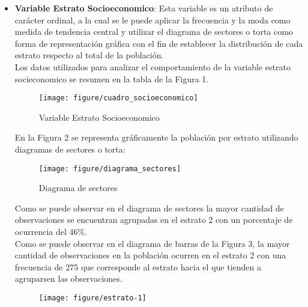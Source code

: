   \begin{itemize}
	\item \textbf {Variable Estrato Socioeconomico}: Esta variable es un atributo de carácter ordinal, a la cual se le puede aplicar la frecuencia y la moda como medida de tendencia central y utilizar el diagrama de sectores o torta como forma de representación gráfica con el fin de establecer la distribución de cada estrato respecto al total de la población.  \\
	
	Los datos utilizados para analizar el comportamiento de la variable estrato socieconomico se resumen en la tabla de la Figura 1.
	
	\bigskip
	\begin{figure} [ht]
		\centering
		\texttt{[image: figure/cuadro\_socioeconomico]}
		\caption{Variable Estrato Socioeconomico}
		\label{fig:cuadro_socioeconomico}
	\end{figure}

	En la Figura 2 se representa gráficamente la población por estrato utilizando diagramas de sectores o torta:  
	\bigskip

	\begin{figure} [ht]
		\centering
		\texttt{[image: figure/diagrama\_sectores]}
		\caption{Diagrama de sectores}
		\label{fig:diagrama_sectores}
	\end{figure}

	Como se puede observar en el diagrama de sectores la mayor cantidad de observaciones se encuentran agrupadas en el estrato 2 con un porcentaje de ocurrencia del 46\%.\\
	   
	Como se puede observar en el diagrama de barras de la Figura 3, la mayor cantidad de observaciones en la población ocurren en el estrato 2 con una frecuencia de 275 que corresponde al estrato hacia el que tienden a agruparsen las observaciones.
   
	\begin{figure}[ht]
		\centering
\begin{kframe}
\begin{alltt}
          \hlstd{=}\hlstd{,} \hlstd{=}\hlstd{,} \hlstd{=}\hlstd{))}
\end{alltt}
\end{kframe}
\texttt{[image: figure/estrato-1]} 


\end{figure}
\end{itemize}
